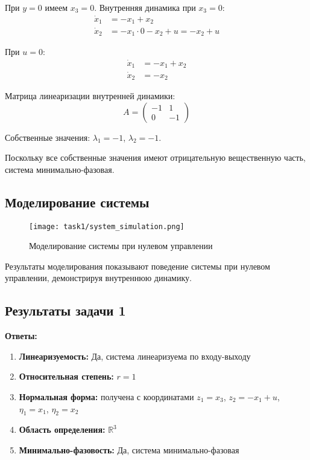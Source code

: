 При $y = 0$ имеем $x_3 = 0$. Внутренняя динамика при $x_3 = 0$:
\begin{align}
\dot{x}_1 &= -x_1 + x_2 \\
\dot{x}_2 &= -x_1 \cdot 0 - x_2 + u = -x_2 + u
\end{align}

При $u = 0$:
\begin{align}
\dot{x}_1 &= -x_1 + x_2 \\
\dot{x}_2 &= -x_2
\end{align}

Матрица линеаризации внутренней динамики:
\begin{equation}
A = \begin{pmatrix} -1 & 1 \\ 0 & -1 \end{pmatrix}
\end{equation}

Собственные значения: $\lambda_1 = -1$, $\lambda_2 = -1$.

Поскольку все собственные значения имеют отрицательную вещественную часть, система минимально-фазовая.

\subsection{Моделирование системы}

\begin{figure}[H]
\centering
\texttt{[image: task1/system\_simulation.png]}
\caption{Моделирование системы при нулевом управлении}
\label{fig:system_simulation}
\end{figure}

Результаты моделирования показывают поведение системы при нулевом управлении, демонстрируя внутреннюю динамику.

\subsection{Результаты задачи 1}

\textbf{Ответы:}
\begin{enumerate}
\item \textbf{Линеаризуемость:} Да, система линеаризуема по входу-выходу
\item \textbf{Относительная степень:} $r = 1$
\item \textbf{Нормальная форма:} получена с координатами $z_1 = x_3$, $z_2 = -x_1 + u$, $\eta_1 = x_1$, $\eta_2 = x_2$
\item \textbf{Область определения:} $\mathbb{R}^3$
\item \textbf{Минимально-фазовость:} Да, система минимально-фазовая
\end{enumerate}

